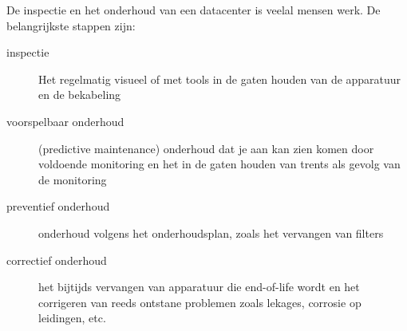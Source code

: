 De inspectie en het onderhoud van een datacenter is veelal mensen werk. De belangrijkste stappen zijn:
\begin{description}
\item[inspectie] Het regelmatig visueel of met tools in de gaten houden van de apparatuur en de bekabeling
\item[voorspelbaar onderhoud] (predictive maintenance) onderhoud dat je aan kan zien komen door voldoende monitoring en het in de gaten houden van trents als gevolg van de monitoring
\item[preventief onderhoud] onderhoud volgens het onderhoudsplan, zoals het vervangen van filters
\item[correctief onderhoud] het bijtijds vervangen van apparatuur die end-of-life wordt en het corrigeren van reeds ontstane problemen zoals lekages, corrosie op leidingen, etc.
\end{description}


